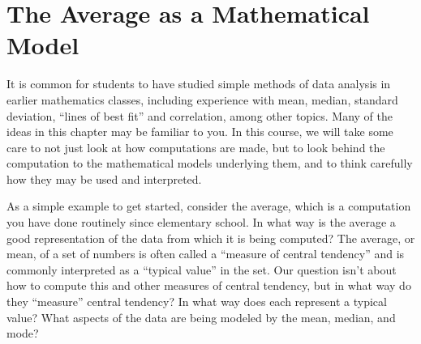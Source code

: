 \documentclass[10pt,]{book}
\theoremstyle{ptxdefinitionnotitle}
\theoremstyle{ptxdefinitiontitle}
\numberwithin{equation}{section}
\begin{document}
\section[{The Average as a Mathematical Model}]{The Average as a Mathematical Model}\label{chapter01-section03}
\hypertarget{p-38}{}%
It is common for students to have studied simple methods of data analysis in earlier mathematics classes, including experience with mean, median, standard deviation, ``lines of best fit'' and correlation, among other topics. Many of the ideas in this chapter may be familiar to you. In this course, we will take some care to not just look at how computations are made, but to look behind the computation to the mathematical models underlying them, and to think carefully how they may be used and interpreted. \\%
\par
\hypertarget{p-39}{}%
As a simple example to get started, consider the average, which is a computation you have done routinely since elementary school. In what way is the average a good representation of the data from which it is being computed? The average, or mean, of a set of numbers is often called a ``measure of central tendency'' and is commonly interpreted as a ``typical value'' in the set. Our question isn’t about how to compute this and other measures of central tendency, but in what way do they ``measure'' central tendency? In what way does each represent a typical value? What aspects of the data are being modeled by the mean, median, and mode? \\%
\end{document}
